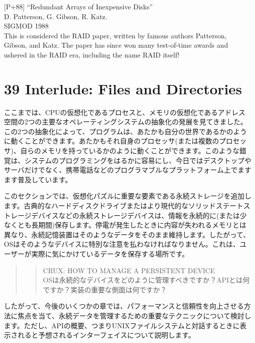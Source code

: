 {[}P+88{]} ``Redundant Arrays of Inexpensive Disks''\\
D. Patterson, G. Gibson, R. Katz.\\
SIGMOD 1988\\
This is considered the RAID paper, written by famous authors Patterson,
Gibson, and Katz. The paper has since won many test-of-time awards and
ushered in the RAID era, including the name RAID itself!

\hypertarget{interlude-files-and-directories}{%
\section*{39 Interlude: Files and
Directories}\label{interlude-files-and-directories}}

ここまでは、CPUの仮想化であるプロセスと、メモリの仮想化であるアドレス空間の2つの主要なオペレーティングシステムの抽象化の発展を見てきました。この2つの抽象化によって、プログラムは、あたかも自分の世界であるかのように動くことができます。あたかもそれ自身のプロセッサ(または複数のプロセッサ)、自らのメモリを持っているかのように動くことができます。このような錯覚は、システムのプログラミングをはるかに容易にし、今日ではデスクトップやサーバだけでなく、携帯電話などのプログラマブルなプラットフォーム上でますます普及しています。

このセクションでは、仮想化パズルに重要な要素である永続ストレージを追加します。古典的なハードディスクドライブまたはより現代的なソリッドステートストレージデバイスなどの永続ストレージデバイスは、情報を永続的に(または少なくとも長期間)保存します。停電が発生したときに内容が失われるメモリとは異なり、永続記憶装置はそのようなデータをそのまま維持します。したがって、OSはそのようなデバイスに特別な注意を払わなければなりません。これは、ユーザーが実際に気にかけているデータを保存する場所です。

\begin{quote}
\begin{quote}
CRUX: HOW TO MANAGE A PERSISTENT DEVICE\\
OSは永続的なデバイスをどのように管理すべきですか？APIとは何ですか？実装の重要な側面は何ですか？
\end{quote}
\end{quote}

したがって、今後のいくつかの章では、パフォーマンスと信頼性を向上させる方法に焦点を当て、永続データを管理するための重要なテクニックについて検討します。ただし、APIの概要、つまりUNIXファイルシステムと対話するときに表示されると予想されるインターフェイスについて説明します。

